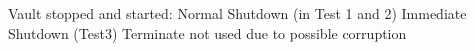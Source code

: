 Vault stopped and started:
Normal Shutdown (in Test 1 and 2)
Immediate Shutdown (Test3) 
Terminate not used due to possible corruption